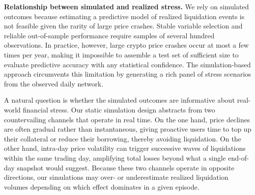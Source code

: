 \documentclass[a4paper,UKenglish,cleveref, autoref, thm-restate]{informs3}
\newcommand{\julnote}[1]{{\color{purple}{{\bf Julien:} #1}}}
\newcommand{\boldpara}[1]{\noindent\textbf{#1}\quad}
\begin{document}

\medskip
\boldpara{Relationship between simulated and realized stress.} We rely on simulated outcomes because estimating a predictive model of realized liquidation events is not feasible given the rarity of large price crashes. Stable variable selection and reliable out-of-sample performance require samples of several hundred observations. In practice, however, large crypto price crashes occur at most a few times per year, making it impossible to assemble a test set of sufficient size to evaluate predictive accuracy with any statistical confidence. The simulation-based approach circumvents this limitation by generating a rich panel of stress scenarios from the observed daily network. %

A natural question is whether the simulated outcomes are informative about real-world financial stress. Our static simulation design abstracts from two countervailing channels that operate in real time. On the one hand, price declines are often gradual rather than instantaneous, giving proactive users time to top up their collateral or reduce their borrowing, thereby avoiding liquidation. On the other hand, intra-day price volatility can trigger successive waves of liquidations within the same trading day, amplifying total losses beyond what a single end-of-day snapshot would suggest. Because these two channels operate in opposite directions, our simulations may over- or underestimate realized liquidation volumes depending on which effect dominates in a given episode.
\end{document}
